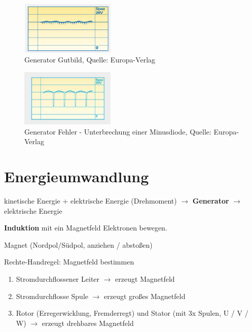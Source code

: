 \begin{figure}[!ht]%
\centering
\includegraphics[width=0.4\textwidth]{images/Generator/Generator-2.pdf}
\caption{Generator Gutbild, Quelle: Europa-Verlag}
\end{figure}

\begin{figure}[!ht]%
\centering
\includegraphics[width=0.4\textwidth]{images/Generator/Generator-5.pdf}
\caption{Generator Fehler - Unterbrechung einer Minusdiode, Quelle:
Europa-Verlag}
\end{figure}

\newpage

\section{Energieumwandlung}\label{energieumwandlung}

kinetische Energie + elektrische Energie (Drehmoment) $\to$
\textbf{Generator} $\to$ elektrische Energie

\textbf{Induktion} mit ein Magnetfeld Elektronen bewegen.

Magnet (Nordpol/Südpol, anziehen / abstoßen)

Rechte-Handregel: Magnetfeld bestimmen

\begin{enumerate}
\item
  Stromdurchflossener Leiter $\to$ erzeugt Magnetfeld
\item
  Stromdurchflosse Spule $\to$ erzeugt großes Magnetfeld
\item
  Rotor (Erregerwicklung, Fremderregt) und Stator (mit 3x Spulen, U / V
  / W) $\to$ erzeugt drehbares Magnetfeld
\end{enumerate}

